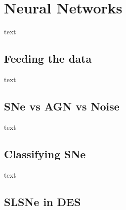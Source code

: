 \section{Neural Networks}
text
\subsection{Feeding the data}
text
\subsection{SNe vs AGN vs Noise}
text
\subsection{Classifying SNe}
text
\subsection{SLSNe in DES}
